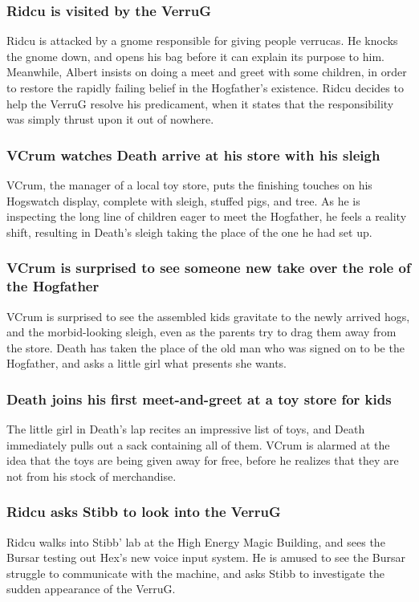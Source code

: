\subsubsection{\Gls{Ridcu} is visited by the \Gls{VerruG}}
\Gls{Ridcu} is attacked by a gnome responsible for giving people verrucas. He knocks the gnome down,
and opens his bag before it can explain its purpose to him. Meanwhile, \Gls{Albert} insists on
doing a meet and greet with some children, in order to restore the rapidly failing belief in the
Hogfather's existence. \Gls{Ridcu} decides to help the \Gls{VerruG} resolve his predicament, when
it states that the responsibility was simply thrust upon it out of nowhere.

\subsubsection{\Gls{VCrum} watches \Gls{Death} arrive at his store with his sleigh}
\Gls{VCrum}, the manager of a local toy store, puts the finishing touches on his Hogswatch
display, complete with sleigh, stuffed pigs, and tree. As he is inspecting the long line of children
eager to meet the Hogfather, he feels a reality shift, resulting in \Gls{Death}'s sleigh taking the
place of the one he had set up.

\subsubsection{\Gls{VCrum} is surprised to see someone new take over the role of the Hogfather}
\Gls{VCrum} is surprised to see the assembled kids gravitate to the newly arrived hogs, and the
morbid-looking sleigh, even as the parents try to drag them away from the store. \Gls{Death} has
taken the place of the old man who was signed on to be the Hogfather, and asks a little girl what
presents she wants.

\subsubsection{\Gls{Death} joins his first meet-and-greet at a toy store for kids}
The little girl in \Gls{Death}'s lap recites an impressive list of toys, and \Gls{Death} immediately
pulls out a sack containing all of them. \Gls{VCrum} is alarmed at the idea that the toys are being
given away for free, before he realizes that they are not from his stock of merchandise.

\subsubsection{\Gls{Ridcu} asks \Gls{Stibb} to look into the \Gls{VerruG}}
\Gls{Ridcu} walks into \Gls{Stibb}' lab at the High Energy Magic Building, and sees the \Gls{Bursar}
testing out \Gls{Hex}'s new voice input system. He is amused to see the \Gls{Bursar} struggle to
communicate with the machine, and asks \Gls{Stibb} to investigate the sudden appearance of the
\Gls{VerruG}.

